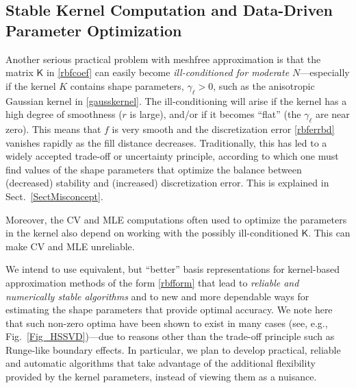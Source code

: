 \documentclass[11pt]{NSFamsart}
\newcommand{\mK}{\mathsf{K}}
\begin{document}
\subsection*{Stable Kernel Computation and Data-Driven Parameter Optimization} Another serious practical problem with meshfree approximation is that the matrix $\mK$ in \eqref{rbfcoef} can easily become \emph{ill-conditioned for moderate $N$}---especially if the kernel $K$ contains shape parameters, $\gamma_\ell>0$, such as the anisotropic Gaussian kernel in \eqref{gausskernel}.  The ill-conditioning will arise if the kernel has a high degree of smoothness ($r$ is large), and/or if it becomes ``flat'' (the $\gamma_\ell$ are near zero). This means that $f$ is very smooth and the discretization error \eqref{rbferrbd} vanishes rapidly as the fill distance decreases.
Traditionally, this has led to a widely accepted trade-off or uncertainty principle, according to which one must find values of the shape parameters that optimize the balance between (decreased) stability and (increased) discretization error.  This is explained in Sect.\ \ref{SectMisconcept}.

Moreover, the CV and MLE computations often used to optimize the parameters in the kernel also depend on working with the possibly ill-conditioned $\mK$.  This can make CV and MLE unreliable.

We intend to use equivalent, but ``better'' basis representations for kernel-based approximation methods of the form \eqref{rbfform} that lead to \emph{reliable and numerically stable algorithms} and to new and more dependable ways for estimating the shape parameters that provide optimal accuracy. We note here that such non-zero optima have been shown to exist in many cases (see, e.g., Fig.~\ref{Fig_HSSVD})---due to reasons other than the trade-off principle such as Runge-like boundary effects. In particular, we plan to develop practical, reliable and automatic algorithms that take advantage of the additional flexibility provided by the kernel parameters, instead of viewing them as a nuisance.
\end{document}

